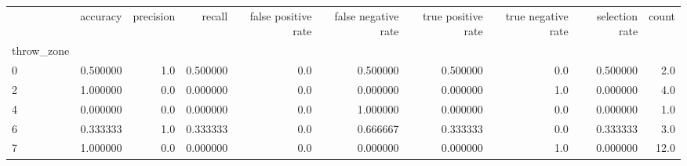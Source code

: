\begin{tabular}{lrrrrrrrrr}
\toprule
{} &  accuracy &  precision &    recall &  false positive rate &  false negative rate &  true positive rate &  true negative rate &  selection rate &  count \\
throw\_zone &           &            &           &                      &                      &                     &                     &                 &        \\
\midrule
0          &  0.500000 &        1.0 &  0.500000 &                  0.0 &             0.500000 &            0.500000 &                 0.0 &        0.500000 &    2.0 \\
2          &  1.000000 &        0.0 &  0.000000 &                  0.0 &             0.000000 &            0.000000 &                 1.0 &        0.000000 &    4.0 \\
4          &  0.000000 &        0.0 &  0.000000 &                  0.0 &             1.000000 &            0.000000 &                 0.0 &        0.000000 &    1.0 \\
6          &  0.333333 &        1.0 &  0.333333 &                  0.0 &             0.666667 &            0.333333 &                 0.0 &        0.333333 &    3.0 \\
7          &  1.000000 &        0.0 &  0.000000 &                  0.0 &             0.000000 &            0.000000 &                 1.0 &        0.000000 &   12.0 \\
\bottomrule
\end{tabular}
